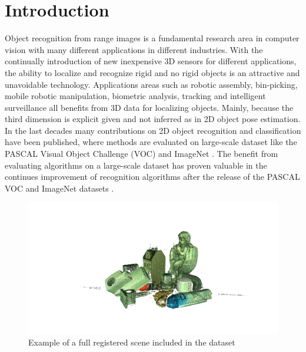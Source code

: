 \documentclass[10pt,twocolumn,letterpaper]{article}
\begin{document}

\section{Introduction} %
Object recognition from range images is a fundamental research area in computer vision with many different applications in different industries. With the continually introduction of new inexpensive 3D sensors for different applications, the ability to localize and recognize rigid and no rigid objects is an attractive and unavoidable technology. Applications areas such as robotic assembly, bin-picking, mobile robotic manipulation, biometric analysis, tracking and intelligent surveillance all benefits from 3D data for localizing objects. Mainly, because the third dimension is explicit given and not inferred as in 2D object pose estimation. In the last decades many contributions on 2D object recognition and classification have been published, where methods are evaluated on large-scale dataset like the PASCAL Visual Object Challenge (VOC) \cite{Everingham2014} and ImageNet \cite{Imagenet2009}. The benefit from evaluating algorithms on a large-scale dataset has proven valuable in the continues improvement of recognition algorithms after the release of the PASCAL VOC and ImageNet datasets \cite{Everingham2014}.
\begin{figure}[t]
\centering
\includegraphics[clip, trim=14cm 5cm 10cm 5cm,width=0.8\linewidth, height= 0.8\linewidth, keepaspectratio]{img/scenes/full_scene00.png}
\caption{Example of a full registered scene included in the dataset}
\label{fig:scene}
\end{figure}
\end{document}

